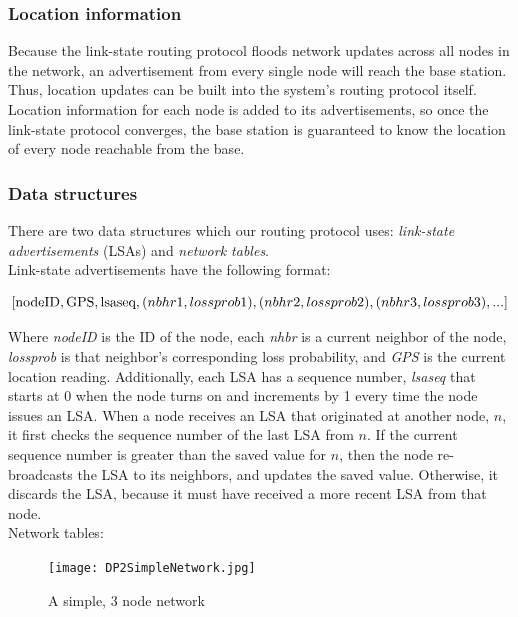 \documentclass[letterpaper]{article}
\begin{document}
\subsubsection{Location information}

\noindent Because the link-state routing protocol floods network updates across all nodes in the network,
an advertisement from every single node will reach the base station. Thus, location updates can be built 
into the system's routing protocol itself. Location information for each node is added to its 
advertisements, so once the link-state protocol converges, the base station is guaranteed to know the
location of every node reachable from the base.

\subsubsection{Data structures}

\noindent There are two data structures which our routing protocol uses: \emph{link-state advertisements} 
(LSAs) and \emph{network tables}. 
\\

\noindent Link-state advertisements have the following format:

$$ [\textnormal{nodeID}, \textnormal{GPS}, \textnormal{lsaseq}, (nbhr1, lossprob1), 
(nbhr2, lossprob2), (nbhr3, lossprob3), ...] $$

\noindent Where \emph{nodeID} is the ID of the node, each \emph{nhbr} is a current neighbor of the node,
\emph{lossprob} is that neighbor's corresponding loss probability, and \emph{GPS} is the current location
reading. Additionally, each LSA has a sequence number, \emph{lsaseq} that starts at 0 when the node turns on
and increments by 1 every time the node issues an LSA. When a node receives an LSA that originated at another
node, $n$, it first checks the sequence number of the last LSA from $n$. If the current sequence number is 
greater than the saved value for $n$, then the node re-broadcasts the LSA to its neighbors, and updates the 
saved value. Otherwise, it discards the LSA, because it must have received a more recent LSA from that node.
\\

\noindent Network tables: 

\begin{figure}[ht!]
\centering
\texttt{[image: DP2SimpleNetwork.jpg]}
\caption{A simple, 3 node network}
\end{figure}
\end{document}
